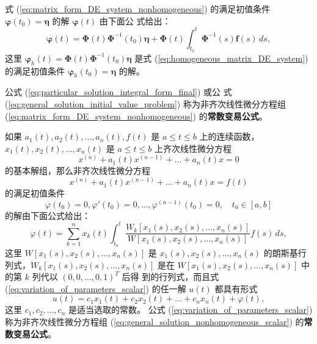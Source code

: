 \begin{corollary}[常数变易公式]\label{cor:常数变易公式}
    式 (\ref{eq:matrix_form_DE_system_nonhomogeneous}) 的满足初值条件 $\boldsymbol{\varphi}(t_0) = \boldsymbol{\eta}$ 的解 $\boldsymbol{\varphi}(t)$ 由下面公
式给出：
\begin{equation}
\boldsymbol{\varphi}(t) = \boldsymbol{\Phi}(t)\boldsymbol{\Phi}^{-1}(t_0)\boldsymbol{\eta}+\boldsymbol{\Phi}(t)\int_{t_0}^{t} \boldsymbol{\Phi}^{-1}(s)\mathbf{f}(s)\,ds, \label{eq:general_solution_initial_value_problem}
\end{equation}
这里 $\boldsymbol{\varphi}_h(t) = \boldsymbol{\Phi}(t)\boldsymbol{\Phi}^{-1}(t_0)\boldsymbol{\eta}$ 是式 (\ref{eq:homogeneous_matrix_DE_system}) 的满足初值条件 $\boldsymbol{\varphi}_h(t_0) = \boldsymbol{\eta}$ 的解。
\end{corollary}

\begin{remark}
    公式 (\ref{eq:particular_solution_integral_form_final}) 或公
式 (\ref{eq:general_solution_initial_value_problem}) 称为非齐次线性微分方程组 (\ref{eq:matrix_form_DE_system_nonhomogeneous}) 的\textbf{常数变易公式}。
\end{remark}

\begin{corollary}\label{cor:variation_of_parameters_single_equation}

如果 $a_1(t), a_2(t), \dots, a_n(t), f(t)$ 是 $a \le t \le b$ 上的连续函数，$x_1(t), x_2(t), \dots,
x_n(t)$ 是 $a \le t \le b$ 上齐次线性微分方程
$$x^{(n)}+a_1(t)x^{(n-1)}+\dots+a_n(t)x=0$$
的基本解组，那么非齐次线性微分方程
$$x^{(n)}+a_1(t)x^{(n-1)}+\dots+a_n(t)x=f(t)$$
的满足初值条件
$$\varphi(t_0)=0, \varphi'(t_0)=0, \dots, \varphi^{(n-1)}(t_0)=0, \quad t_0 \in [a,b]$$
的解由下面公式给出：
\begin{equation}
\varphi(t) = \sum_{k=1}^n x_k(t) \int_{t_0}^{t} \frac{W_k[x_1(s),x_2(s),\dots,x_n(s)]}{W[x_1(s),x_2(s),\dots,x_n(s)]}f(s)\,ds, \label{eq:variation_of_parameters_scalar}
\end{equation}
这里 $W[x_1(s),x_2(s),\dots,x_n(s)]$ 是 $x_1(s),x_2(s),\dots,x_n(s)$ 的朗斯基行列式，$W_k[x_1(s),x_2(s),\dots,x_n(s)]$
是在 $W[x_1(s),x_2(s),\dots,x_n(s)]$ 中的第 $k$ 列代以 $(0,0,\dots,0,1)^T$ 后得
到的行列式，而且式 (\ref{eq:variation_of_parameters_scalar}) 的任一解 $u(t)$ 都具有形式
\begin{equation}
u(t)=c_1x_1(t)+c_2x_2(t)+\dots+c_nx_n(t)+\varphi(t), \label{eq:general_solution_nonhomogeneous_scalar}
\end{equation}
这里 $c_1,c_2,\dots,c_n$ 是适当选取的常数。
公式 (\ref{eq:variation_of_parameters_scalar}) 称为非齐次线性微分方程组 (\ref{eq:general_solution_nonhomogeneous_scalar}) 的\textbf{常数变易公式}。
\end{corollary}

